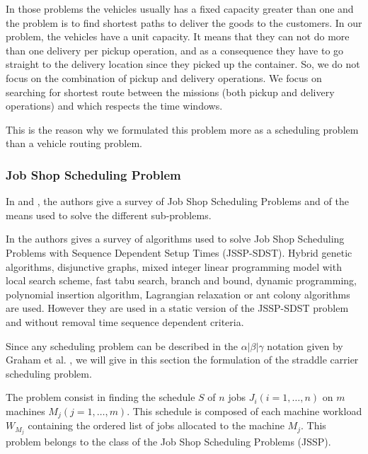 \documentclass[a4paper,10pt]{article}
\begin{document}
In those problems the vehicles usually has a fixed capacity greater than one and the problem is to find shortest paths to deliver the goods to the customers. In our problem, the vehicles have a unit capacity. It means that they can not do more than one delivery per pickup operation, and as a consequence they have to go straight to the delivery location since they picked up the container. So, we do not focus on the combination of pickup and delivery operations. We focus on searching for shortest route between the missions (both pickup and delivery operations) and which respects the time windows.

This is the reason why we formulated this problem more as a scheduling problem than a vehicle routing problem.

	\subsubsection{Job Shop Scheduling Problem}
In \cite{Jain1999} and \cite{Brucker2010}, the authors give a survey of Job Shop Scheduling Problems and of the means used to solve the different sub-problems.
  
In \cite{Allahverdi2008} the authors gives a survey of algorithms used to solve Job Shop Scheduling Problems with Sequence Dependent Setup Times (JSSP-SDST). Hybrid genetic algorithms, disjunctive graphs, mixed integer linear programming model with local search scheme, fast tabu search, branch and bound, dynamic programming, polynomial insertion algorithm, Lagrangian relaxation or ant colony algorithms are used. However they are used in a static version of the JSSP-SDST problem and without removal time sequence dependent criteria.

Since any scheduling problem can be described in the $\alpha|\beta|\gamma$ notation given by Graham et al. \cite{Graham1979}, we will give in this section the formulation of the straddle carrier scheduling problem.

The problem consist in finding the schedule $S$ of $n$ jobs $J_i(i=1,\ldots,n)$ on $m$ machines $M_j(j=1,\ldots,m)$. 
This schedule is composed of each machine workload $W_{M_j}$ containing the ordered list of jobs allocated to the machine $M_j$. This problem belongs to the class of the Job Shop Scheduling Problems (JSSP).
\end{document}
